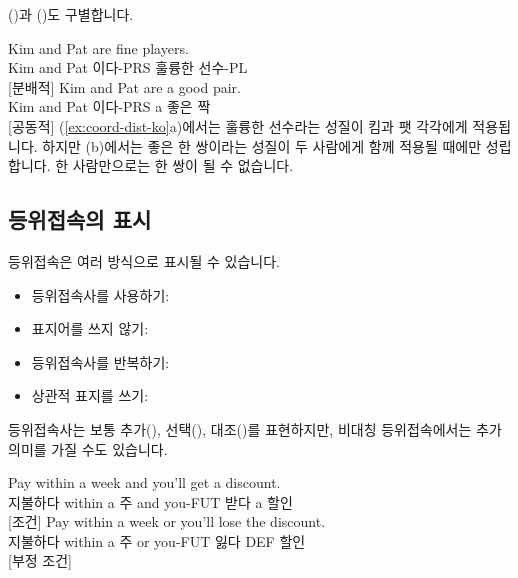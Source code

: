 ()과 ()도 구별합니다.

\ea \label{ex:coord-dist-ko}
    \ea \gll Kim and Pat are fine players.\\
        Kim and Pat 이다-PRS 훌륭한 선수-PL\\
    \glt {} [분배적]
    \ex \gll Kim and Pat are a good pair.\\
        Kim and Pat 이다-PRS a 좋은 짝\\
    \glt {} [공동적]
    \z
\z
(\ref{ex:coord-dist-ko}a)에서는 훌륭한 선수라는 성질이 킴과 팻 각각에게 적용됩니다. 하지만 (b)에서는 좋은 한 쌍이라는 성질이 두 사람에게 함께 적용될 때에만 성립합니다. 한 사람만으로는 한 쌍이 될 수 없습니다.

\subsection{등위접속의 표시}

등위접속은 여러 방식으로 표시될 수 있습니다.
\begin{itemize}[noitemsep]
    \item 등위접속사를 사용하기: 
    \item 표지어를 쓰지 않기: 
    \item 등위접속사를 반복하기: 
    \item 상관적 표지를 쓰기: 
\end{itemize}

등위접속사는 보통 추가(), 선택(), 대조()를 표현하지만, 비대칭 등위접속에서는 추가 의미를 가질 수도 있습니다.

\ea \label{ex:coord-meaning-ko}
    \ea \gll Pay within a week and you'll get a discount.\\
        지불하다 within a 주 and you-FUT 받다 a 할인\\
    \glt {} [조건]
    \ex \gll Pay within a week or you'll lose the discount.\\
        지불하다 within a 주 or you-FUT 잃다 DEF 할인\\
    \glt {} [부정 조건]
    \z
\z

